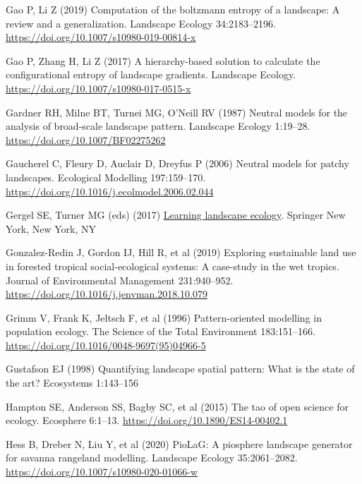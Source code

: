 \documentclass[
  10pt,
  a4paperpaper,
]{article}
\newlength{\cslhangindent}
\newenvironment{CSLReferences}[2] %
 {\begin{list}{}{%
  \setlength{\itemindent}{0pt}
  \setlength{\leftmargin}{0pt}
  \setlength{\parsep}{0pt}
  \ifodd #1
   \setlength{\leftmargin}{\cslhangindent}
   \setlength{\itemindent}{-1\cslhangindent}
  \fi
  \setlength{\itemsep}{#2\baselineskip}}}
 {\end{list}}
\begin{document}
\begin{CSLReferences}{1}{1}
Gao P, Li Z (2019) Computation of the boltzmann entropy of a landscape:
A review and a generalization. Landscape Ecology 34:2183--2196.
\url{https://doi.org/10.1007/s10980-019-00814-x}

Gao P, Zhang H, Li Z (2017) A hierarchy-based solution to calculate the
configurational entropy of landscape gradients. Landscape Ecology.
\url{https://doi.org/10.1007/s10980-017-0515-x}

Gardner RH, Milne BT, Turnei MG, O'Neill RV (1987) Neutral models for
the analysis of broad-scale landscape pattern. Landscape Ecology
1:19--28. \url{https://doi.org/10.1007/BF02275262}

Gaucherel C, Fleury D, Auclair D, Dreyfus P (2006) Neutral models for
patchy landscapes. Ecological Modelling 197:159--170.
\url{https://doi.org/10.1016/j.ecolmodel.2006.02.044}

Gergel SE, Turner MG (eds) (2017)
\href{https://doi.org/10.1007/978-1-4939-6374-4}{Learning landscape
ecology}. Springer New York, New York, NY

Gonzalez-Redin J, Gordon IJ, Hill R, et al (2019) Exploring sustainable
land use in forested tropical social-ecological systems: A case-study in
the wet tropics. Journal of Environmental Management 231:940--952.
\url{https://doi.org/10.1016/j.jenvman.2018.10.079}

Grimm V, Frank K, Jeltsch F, et al (1996) Pattern-oriented modelling in
population ecology. The Science of the Total Environment 183:151--166.
\url{https://doi.org/10.1016/0048-9697(95)04966-5}

Gustafson EJ (1998) Quantifying landscape spatial pattern: What is the
state of the art? Ecosystems 1:143--156

Hampton SE, Anderson SS, Bagby SC, et al (2015) The tao of open science
for ecology. Ecosphere 6:1--13.
\url{https://doi.org/10.1890/ES14-00402.1}

Hess B, Dreber N, Liu Y, et al (2020) PioLaG: A piosphere landscape
generator for savanna rangeland modelling. Landscape Ecology
35:2061--2082. \url{https://doi.org/10.1007/s10980-020-01066-w}


\end{CSLReferences}
\end{document}
